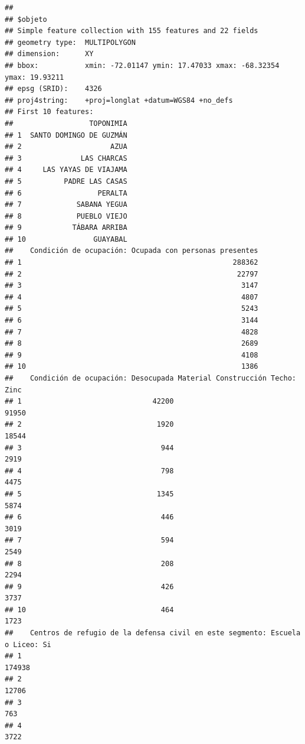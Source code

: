 \documentclass[11pt,]{article}
\begin{document}
\begin{verbatim}
## 
## $objeto
## Simple feature collection with 155 features and 22 fields
## geometry type:  MULTIPOLYGON
## dimension:      XY
## bbox:           xmin: -72.01147 ymin: 17.47033 xmax: -68.32354 ymax: 19.93211
## epsg (SRID):    4326
## proj4string:    +proj=longlat +datum=WGS84 +no_defs
## First 10 features:
##                  TOPONIMIA
## 1  SANTO DOMINGO DE GUZMÁN
## 2                     AZUA
## 3              LAS CHARCAS
## 4     LAS YAYAS DE VIAJAMA
## 5          PADRE LAS CASAS
## 6                  PERALTA
## 7             SABANA YEGUA
## 8             PUEBLO VIEJO
## 9            TÁBARA ARRIBA
## 10                GUAYABAL
##    Condición de ocupación: Ocupada con personas presentes
## 1                                                  288362
## 2                                                   22797
## 3                                                    3147
## 4                                                    4807
## 5                                                    5243
## 6                                                    3144
## 7                                                    4828
## 8                                                    2689
## 9                                                    4108
## 10                                                   1386
##    Condición de ocupación: Desocupada Material Construcción Techo: Zinc
## 1                               42200                             91950
## 2                                1920                             18544
## 3                                 944                              2919
## 4                                 798                              4475
## 5                                1345                              5874
## 6                                 446                              3019
## 7                                 594                              2549
## 8                                 208                              2294
## 9                                 426                              3737
## 10                                464                              1723
##    Centros de refugio de la defensa civil en este segmento: Escuela o Liceo: Si
## 1                                                                        174938
## 2                                                                         12706
## 3                                                                           763
## 4                                                                          3722

\end{verbatim}
\end{document}
